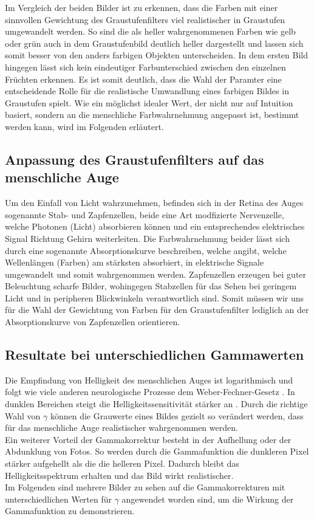\documentclass[course=erap]{aspdoc}
\begin{document}
	Im Vergleich der beiden Bilder ist zu erkennen, dass die Farben mit einer sinnvollen Gewichtung des Graustufenfilters viel realistischer in Graustufen umgewandelt werden. So sind die als heller wahrgenommenen Farben wie gelb oder grün auch in dem Graustufenbild deutlich heller dargestellt und lassen sich somit besser von den anders farbigen Objekten unterscheiden. In dem ersten Bild hingegen lässt sich kein eindeutiger Farbunterschied zwischen den einzelnen Früchten erkennen. Es ist somit deutlich, dass die Wahl der Paramter eine entscheidende Rolle für die realistische Umwandlung eines farbigen Bildes in Graustufen spielt. Wie ein möglichst idealer Wert, der nicht nur auf Intuition basiert, sondern an die menschliche Farbwahrnehmung angepasst ist, bestimmt werden kann, wird im Folgenden erläutert.
	\subsection{Anpassung des Graustufenfilters auf das menschliche Auge}
	Um den Einfall von Licht wahrzunehmen, befinden sich in der Retina des Auges sogenannte Stab- und Zapfenzellen, beide eine Art modfizierte Nervenzelle, welche Photonen (Licht) absorbieren können und ein entsprechendes elektrisches Signal Richtung Gehirn weiterleiten.
	Die Farbwahrnehmung beider lässt sich durch eine sogenannte Absorptionskurve beschreiben, welche angibt, welche Wellenlängen (Farben) am stärksten absorbiert, in elektrische Signale umgewandelt und somit wahrgenommen werden.
	Zapfenzellen erzeugen bei guter Beleuchtung scharfe Bilder, wohingegen Stabzellen für das Sehen bei geringem Licht und in peripheren Blickwinkeln verantwortlich sind. Somit müssen wir uns für die Wahl der Gewichtung von Farben für den Graustufenfilter lediglich an der Absorptionskurve von Zapfenzellen orientieren.
	\subsection{Resultate bei unterschiedlichen Gammawerten}
	Die Empfindung von Helligkeit des menschlichen Auges ist logarithmisch und folgt wie viele anderen neurologische Prozesse dem Weber-Fechner-Gesetz \cite{weberFechnerGesetz}. In dunklen Bereichen steigt die Helligkeitssensitivität stärker an \cite{Logarithmische_Helligkeitswahrnehmung}. Durch die richtige Wahl von $\gamma$ können die Grauwerte eines Bildes gezielt so verändert werden, dass für das menschliche Auge realistischer wahrgenommen werden. 
	\\
	\newline
	Ein weiterer Vorteil der Gammakorrektur besteht in der Aufhellung oder der Abdunklung von Fotos. So werden durch die Gammafunktion die dunkleren Pixel stärker aufgehellt als die die helleren Pixel. \cite{gammKorrekturWikipedia}
	Dadurch bleibt das Helligkeitsspektrum erhalten und das Bild wirkt realistischer.
	\\
	\newline
	Im Folgenden sind mehrere Bilder zu sehen auf die Gammakorrekturen mit unterschiedlichen Werten für $\gamma$ angewendet worden sind, um die Wirkung der Gammafunktion zu demonstrieren.  
	
\end{document}
